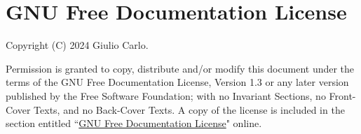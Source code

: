 \documentclass[12pt,b5paper]{article}
\begin{document}
\section*{GNU Free Documentation License}
    Copyright (C)  2024 Giulio Carlo.
   
    Permission is granted to copy, distribute and/or modify this document
    under the terms of the GNU Free Documentation License, Version 1.3
    or any later version published by the Free Software Foundation;
    with no Invariant Sections, no Front-Cover Texts, and no Back-Cover Texts.
    A copy of the license is included in the section entitled ``\href{https://www.gnu.org/licenses/fdl-1.3.en.html}{GNU Free Documentation License}"
    online.
\end{document}
